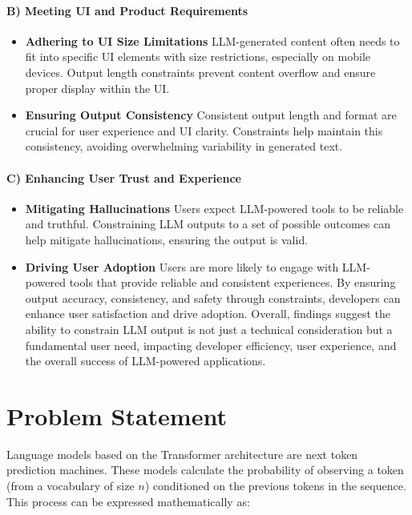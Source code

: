 \paragraph{B) Meeting UI and Product Requirements}
\begin{itemize}
    \item \textbf{Adhering to UI Size Limitations}
LLM-generated content often needs to fit into specific UI elements with size restrictions, especially on mobile devices. Output length constraints prevent content overflow and ensure proper display within the UI.
    \item \textbf{Ensuring Output Consistency}
Consistent output length and format are crucial for user experience and UI clarity. Constraints help maintain this consistency, avoiding overwhelming variability in generated text.
\end{itemize}


\paragraph{C) Enhancing User Trust and Experience}
\begin{itemize}
    \item \textbf{Mitigating Hallucinations}
Users expect LLM-powered tools to be reliable and truthful. Constraining LLM outputs to a set of possible outcomes can help mitigate hallucinations, ensuring the output is valid.
    \item \textbf{Driving User Adoption}
Users are more likely to engage with LLM-powered tools that provide reliable and consistent experiences. By ensuring output accuracy, consistency, and safety through constraints, developers can enhance user satisfaction and drive adoption.
Overall, findings suggest the ability to constrain LLM output is not just a technical consideration but a fundamental user need, impacting developer efficiency, user experience, and the overall success of LLM-powered applications.
\end{itemize}

\section{Problem Statement}

Language models based on the Transformer architecture are next token prediction machines.
These models calculate the probability of observing a token (from a vocabulary of size $n$) conditioned on the previous tokens in the sequence. This process can be expressed mathematically as:

